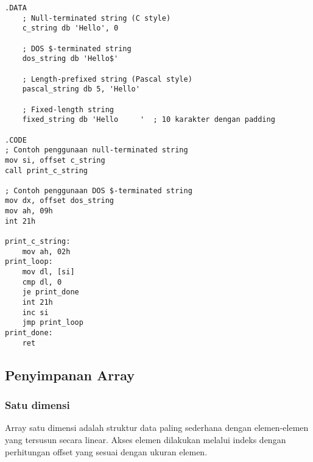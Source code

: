 \documentclass[../main.tex]{subfiles}
\begin{document}
            \begin{lstlisting}[language={[x86masm]Assembler}, caption=Contoh String dengan Berbagai Konvensi, label={lst:string-conventions}]
.DATA
    ; Null-terminated string (C style)
    c_string db 'Hello', 0
    
    ; DOS $-terminated string
    dos_string db 'Hello$'
    
    ; Length-prefixed string (Pascal style)
    pascal_string db 5, 'Hello'
    
    ; Fixed-length string
    fixed_string db 'Hello     '  ; 10 karakter dengan padding

.CODE
; Contoh penggunaan null-terminated string
mov si, offset c_string
call print_c_string

; Contoh penggunaan DOS $-terminated string
mov dx, offset dos_string
mov ah, 09h
int 21h

print_c_string:
    mov ah, 02h
print_loop:
    mov dl, [si]
    cmp dl, 0
    je print_done
    int 21h
    inc si
    jmp print_loop
print_done:
    ret
            \end{lstlisting}

        \subsection{Penyimpanan Array}
            \subsubsection{Satu dimensi}
                Array satu dimensi adalah struktur data paling sederhana dengan elemen-elemen yang tersusun secara linear. Akses elemen dilakukan melalui indeks dengan perhitungan offset yang sesuai dengan ukuran elemen.
\end{document}
